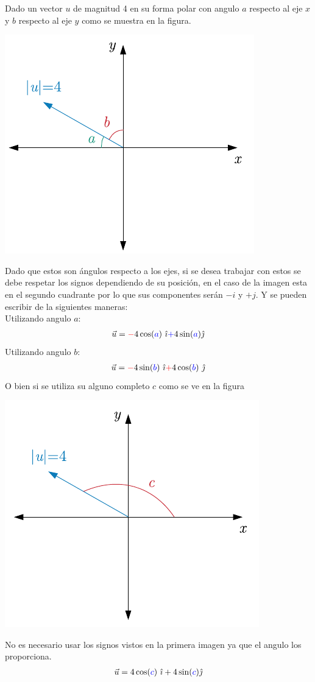\documentclass[10pt,a4paper]{article}
\begin{document}
Dado un vector $u$ de magnitud 4 en su forma polar con angulo $a$ respecto al eje $x$ y $b$ respecto al eje $y$ como se muestra en la figura.
\begin{center}
\includegraphics[scale=1]{2}
\end{center}
Dado que estos son ángulos respecto a los ejes, si se desea trabajar con estos se debe respetar los signos dependiendo de su posición, en el caso de la imagen esta en el segundo cuadrante por lo que sus componentes serán $-i$ y $+j$.
Y se pueden escribir de la siguientes maneras:\\
Utilizando angulo $a$:
\begin{align*}
\vec{u} ={\color{red} -} 4\cos ({\color{blue} a})\,\,\hat{\imath} {\color{blue} +}4\sin( {\color{blue} a})\hat{\jmath}
\end{align*}
Utilizando angulo $b$:
\begin{align*}
 \vec{u} ={\color{red} -} 4\sin ({\color{blue} b} )\,\, \hat{\imath} {\color{red} +}4\cos( {\color{blue} b})\,\,\hat{\jmath}
\end{align*}
\newpage
O bien si se utiliza su alguno completo $c$ como se ve en la figura
\begin{center}
\includegraphics[scale=1]{3}
\end{center}

No es necesario usar los signos vistos en la primera imagen ya que el angulo los proporciona.
\begin{align*}
\vec{u} = 4\cos ({\color{blue} c})\,\,\hat{\imath}+4\sin( {\color{blue} c})\hat{\jmath}\\
\end{align*}
\end{document}
